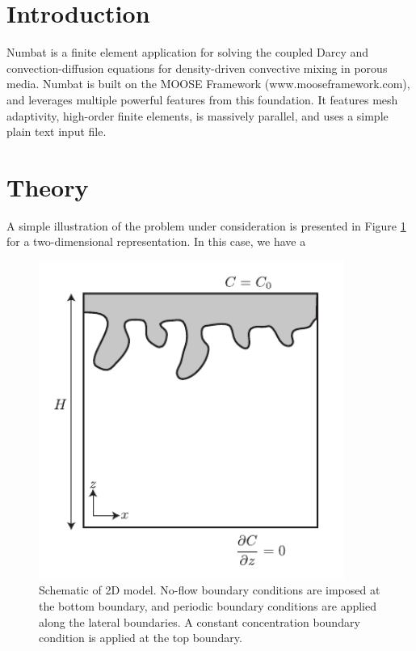\documentclass[11pt, a4paper]{csiroreport2012}
\begin{document}
\section{Introduction}

Numbat is a finite element application for solving the coupled Darcy and convection-diffusion equations for density-driven convective mixing in porous media. Numbat is built on the MOOSE Framework (www.mooseframework.com), and leverages multiple powerful features from this foundation. It features mesh adaptivity, high-order finite elements, is massively parallel, and uses a simple plain text input file. 

\section{Theory}

A simple illustration of the problem under consideration is presented in Figure \ref{fig:schematic} for a two-dimensional representation. In this case, we have a 
\begin{figure}[ht]
\begin{center}
\includegraphics[width=100mm]{figures/schematic.pdf}
\caption{Schematic of 2D model. No-flow boundary conditions are imposed at the bottom boundary, and periodic boundary conditions are applied along the lateral boundaries. A constant concentration boundary condition is applied at the top boundary.}
\label{fig:schematic}
\end{center}
\end{figure}
\end{document}
